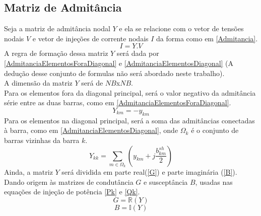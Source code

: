 \subsection{Matriz de Admitância}
Seja a matriz de admitância nodal $Y$ e ela se relacione com o vetor de tensões nodais $V$ e vetor de injeções de corrente nodais $I$ da forma como em \ref{Admitancia}.
\begin{equation}
    I = Y.V
    \label{Admitancia}
\end{equation}
A regra de formação dessa matriz $Y$ será dada por \ref{AdmitanciaElementosForaDiagonal} e \ref{AdmitanciaElementosDiagonal} (A dedução desse conjunto de formulas não será abordado neste trabalho).\\
A dimensão da matriz $Y$ será de $NB$x$NB$.\\
Para os elementos fora da diagonal principal, será o valor negativo da admitância série entre as duas barras, como em \ref{AdmitanciaElementosForaDiagonal}.
\begin{equation}
    Y_{km} = -y_{km}
    \label{AdmitanciaElementosForaDiagonal}
\end{equation}
Para os elementos na diagonal principal, será a soma das admitâncias conectadas à barra, como em \ref{AdmitanciaElementosDiagonal}, onde $\Omega_k$ é o conjunto de barras vizinhas da barra $k$.
\begin{equation}
    Y_{kk} = \sum_{m\in \Omega_k} \left(y_{km} + j\frac{b^{sh}_{km}}{2}\right)
    \label{AdmitanciaElementosDiagonal}
\end{equation}
Ainda, a matriz $Y$ será dividida em parte real(\ref{G}) e parte imaginária (\ref{B}). Dando origem às matrizes de condutância $G$ e susceptância $B$, usadas nas equações de injeção de potência \ref{Pk} e \ref{Qk}.
\begin{equation}
    G = \mathbb{R} (Y)
    \label{G}
\end{equation}
\begin{equation}
    B = \mathbb{I} (Y)
    \label{B}
\end{equation}






